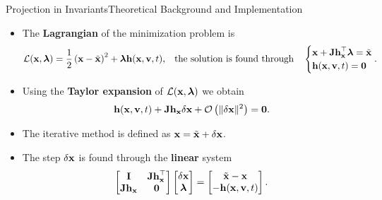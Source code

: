 \begin{frame}{Projection in Invariants}{Theoretical Background and Implementation}
  \begin{itemize}
    \item The \textbf{Lagrangian} of the minimization problem is
    \begin{equation*}
      \mathcal{L}(\mathbf{x}, \boldsymbol{\lambda}) = \frac{1}{2}\left(\mathbf{x} - \tilde{\mathbf{x}}\right)^2 + \boldsymbol{\lambda} \mathbf{h}(\mathbf{x}, \mathbf{v}, t) \text{,}
      \quad \text{the solution is found through} \quad
      \begin{cases}
        \mathbf{x} + \mathbf{Jh}_{\mathbf{x}}^\top \boldsymbol{\lambda} = \tilde{\mathbf{x}} \\
        \mathbf{h}(\mathbf{x}, \mathbf{v}, t) = \mathbf{0}
      \end{cases} \hspace{-1.0em}\text{.}
    \end{equation*}
    \item Using the \textbf{Taylor expansion} of $\mathcal{L}(\mathbf{x}, \boldsymbol{\lambda})$ we obtain
    \begin{equation*}
      \mathbf{h}(\mathbf{x}, \mathbf{v}, t) + \mathbf{Jh}_{\mathbf{x}} \delta\mathbf{x} + \mathcal{O}\left(\| \delta\mathbf{x} \|^2\right) = \mathbf{0} \text{.}
    \end{equation*}
    \item The iterative method is defined as $\mathbf{x} = \tilde{\mathbf{x}} + \delta\mathbf{x}$.
    \item The step $\delta\mathbf{x}$ is found through the \textbf{linear} system
    \begin{equation*}
      \begin{bmatrix}
        \mathbf{I}        & \mathbf{Jh}_{\mathbf{x}}^\top \\
        \mathbf{Jh}_{\mathbf{x}} & \mathbf{0}
      \end{bmatrix}
      \begin{bmatrix}
        \delta\mathbf{x} \\
        \boldsymbol{\lambda}
      \end{bmatrix} = \begin{bmatrix}
        \tilde{\mathbf{x}} - \mathbf{x} \\
        -\mathbf{h}(\mathbf{x}, \mathbf{v}, t)
      \end{bmatrix} \text{.}
    \end{equation*}
  \end{itemize}
\end{frame}

